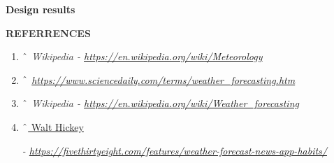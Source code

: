 \documentclass[12pt]{article}
\begin{document}


\vspace{\baselineskip}

\vspace{\baselineskip}
{\fontsize{13pt}{15.6pt}\selectfont \textbf{Design results}\par}\par


\vspace{\baselineskip}
{\fontsize{13pt}{15.6pt}\selectfont \textbf{\textcolor[HTML]{333333}{REFERRENCES}}\par}\par

\begin{enumerate}
	\item {\fontsize{13pt}{15.6pt}\selectfont \textit{\textcolor[HTML]{333333}{$ \string^ $  Wikipedia - \href{https://en.wikipedia.org/wiki/Meteorology}{https://en.wikipedia.org/wiki/Meteorology}}}\par}\par

	\item {\fontsize{13pt}{15.6pt}\selectfont \textit{\textcolor[HTML]{333333}{$ \string^ $  \href{https://www.sciencedaily.com/terms/weather\_forecasting.htm}{https://www.sciencedaily.com/terms/weather\_forecasting.htm}}}\par}\par

	\item {\fontsize{13pt}{15.6pt}\selectfont \textit{\textcolor[HTML]{333333}{$ \string^ $  Wikipedia - \href{https://en.wikipedia.org/wiki/Weather\_forecasting}{https://en.wikipedia.org/wiki/Weather\_forecasting}}}\par}\par

	\item \href{https://fivethirtyeight.com/contributors/walt-hickey/}{$ \string^ $  Walt Hickey}{\fontsize{13pt}{15.6pt}\selectfont \textit{ - \href{https://fivethirtyeight.com/features/weather-forecast-news-app-habits/}{https://fivethirtyeight.com/features/weather-forecast-news-app-habits/}}\par}
\end{enumerate}\par


\vspace{\baselineskip}

\vspace{\baselineskip}

\vspace{\baselineskip}

\vspace{\baselineskip}

\vspace{\baselineskip}

\vspace{\baselineskip}

\vspace{\baselineskip}
\end{document}
